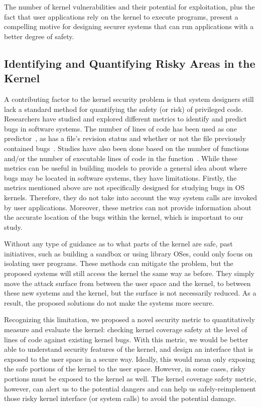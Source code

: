 The number of kernel vulnerabilities and their potential for exploitation, 
plus the fact that user applications rely on the kernel to execute
programs, 
present a compelling motive for designing securer systems that can run
applications with a better degree of safety.

\subsection{Identifying and Quantifying Risky Areas in the Kernel}

A contributing factor to the kernel security problem is that system
designers 
still lack a standard method for quantifying the safety (or risk) of
privileged code. 
Researchers have studied and explored different metrics to identify and
predict bugs in software systems. 
The number of lines of code has been used as one 
predictor~\cite{Bug-Location}, as has a file's revision status and 
whether or not the file previously contained bugs~\cite{lewis2013does,
Bug-Location}. Studies have also been done based on 
the number of functions and/or the number of executable lines of code in
the function~\cite{Mining-Metrics}. 
While these metrics can be useful in building models to provide a general
idea about 
where bugs may be located in software systems, they have limitations. 
Firstly, the metrics mentioned above are not specifically designed for
studying bugs in OS kernels. 
Therefore, they do not take into account the way system calls are invoked
by user applications. 
Moreover, these metrics can not provide information about the accurate
location of the bugs within the kernel, 
which is important to our study.

Without any type of guidance as to what parts of the kernel are safe, past
initiatives, 
such as building a sandbox or using library OSes, could only focus on
isolating user programs. 
These methods can mitigate the problem, but the proposed systems will still
access the kernel the same way as before. 
They simply move the attack surface from between the user space and the
kernel, 
to between these new systems and the kernel, but the surface is not
necessarily reduced. 
As a result, the proposed solutions do not make the systems more secure. 

Recognizing this limitation, we proposed a novel security metric to
quantitatively measure and evaluate the kernel: 
checking kernel coverage safety at the level of lines of code against
existing kernel bugs. 
With this metric, we would be better able to understand security features
of the kernel, 
and design an interface that is exposed to the user space in a secure way.
Ideally, 
this would mean only exposing the safe portions of the kernel to the user
space. 
However, in some cases, risky portions must be exposed to the kernel as
well. 
The kernel coverage safety metric, however, can alert us to the potential
dangers and 
can help us safely-reimplement those risky kernel interface (or system
calls) to avoid the potential damage.

